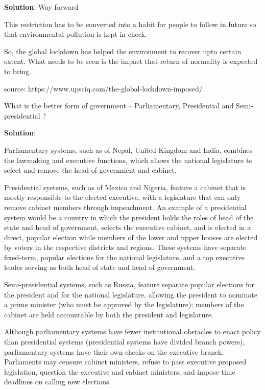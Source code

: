 \documentclass[
]{book}
\newcommand{\question}{\item}
\newenvironment{solution}{ {\bfseries Solution}:}{}
\begin{document}
\begin{questions}
\begin{solution}
Way forward

This restriction has to be converted into a habit for people to follow in future so that environmental pollution is kept in check.

So, the global lockdown has helped the environment to recover upto certain extent. What needs to be seen is the impact that return of normality is expected to bring.

source: https://www.upsciq.com/the-global-lockdown-imposed/
\end{solution}

\question What is the better form of government -- Parliamentary, Presidential and Semi-presidential ?

\begin{solution}

Parliamentary systems, such as of Nepal, United Kingdom and India, combines the lawmaking and executive functions, which allows the national legislature to select and remove the head of government and cabinet.

Presidential systems, such as of Mexico and Nigeria, feature a cabinet that is mostly responsible to the elected executive, with a legislature that can only remove cabinet members through impeachment. An example of a presidential system would be a country in which the president holds the roles of head of the state and head of government, selects the executive cabinet, and is elected in a direct, popular election while members of the lower and upper houses are elected by voters in the respective districts and regions. These systems have separate fixed-term, popular elections for the national legislature, and a top executive leader serving as both head of state and head of government.

Semi-presidential systems, such as Russia, feature separate popular elections for the president and for the national legislature, allowing the president to nominate a prime minister (who must be approved by the legislature); members of the cabinet are held accountable by both the president and legislature.

Although parliamentary systems have fewer institutional obstacles to enact policy than presidential systems (presidential systems have divided branch powers), parliamentary systems have their own checks on the executive branch. Parliaments may censure cabinet ministers, refuse to pass executive proposed legislation, question the executive and cabinet ministers, and impose time deadlines on calling new elections.


\end{solution}
\end{questions}
\end{document}
